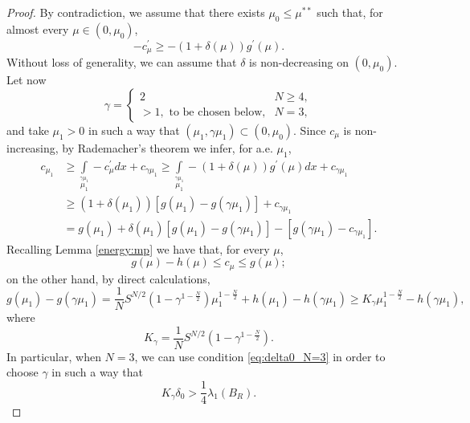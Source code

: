 \documentclass[10pt]{article}
\theoremstyle{definition}
\numberwithin{equation}{section}
\begin{document}
\begin{proof}
By contradiction, we assume that there exists $\mu_{0}\le\mu^{**}$ such that, for almost every
$\mu\in(0,\mu_{0})$,
\begin{equation*}
-c^{\prime}_{\mu}\ge-(1+\delta(\mu))g^{\prime}(\mu).
\end{equation*}
Without loss of generality, we can assume that $\delta$ is non-decreasing on $(0,\mu_0)$.
Let now
\begin{equation}\label{eq:def_gamma}
\gamma=
\begin{cases}
2 & N\ge 4,\\
>1,\text{ to be chosen below,} & N=3,
\end{cases}
\end{equation}
and take $\mu_1>0$ in such a way that
$(\mu_1,\gamma\mu_1)\subset (0,\mu_0)$. Since $c_\mu$ is non-increasing, 
by Rademacher's theorem we infer, for a.e. $\mu_1$,
\begin{equation}\label{eq:S_0_1}
    \begin{aligned}\displaystyle
c_{\mu_{1}}&\geq\int\limits_{\mu_{1}}\limits^{\gamma\mu_{1}}-c^{\prime}_{\mu}dx+c_{\gamma\mu_{1}}\ge\int\limits_{\mu_{1}}\limits^{\gamma\mu_{1}}-(1+\delta(\mu))g^{\prime}(\mu)dx+c_{\gamma\mu_{1}}\\
&\geq(1+\delta(\mu_1))\left[g(\mu_{1})-g(\gamma\mu_{1})\right]+c_{\gamma\mu_{1}}\\
&=g(\mu_{1})+\delta(\mu_1)[ g(\mu_{1})-g(\gamma\mu_{1})] -[g(\gamma\mu_{1})-c_{\gamma\mu_{1}}].
    \end{aligned}
\end{equation}
Recalling Lemma \ref{energy:mp} we have that, for every $\mu$,
\[
g(\mu)-h(\mu) \le c_\mu \le g(\mu);
\]
on the other hand, by direct calculations,
\[
g(\mu_{1})-g(\gamma\mu_{1}) = \frac{1}{N}S^{N/2}(1-\gamma^{1-\frac{N}{2}})\mu_{1}^{1-\frac{N}{2}}
+ h(\mu_{1})-h(\gamma\mu_{1}) \ge K_\gamma\mu_{1}^{1-\frac{N}{2}} - h(\gamma\mu_1),
\]
where
\begin{equation}\label{eq:Kgamma}
K_\gamma = \frac{1}{N}S^{N/2}(1-\gamma^{1-\frac{N}{2}}).
\end{equation}
%
In particular, when $N=3$, we can use condition \eqref{eq:delta0_N=3} in order to
choose $\gamma$ in such a way that
\begin{equation}\label{eq:N=3_Kgamma}
K_\gamma \delta_0 > \frac14 \lambda_1(B_R).
\end{equation}




\end{proof}
\end{document}
